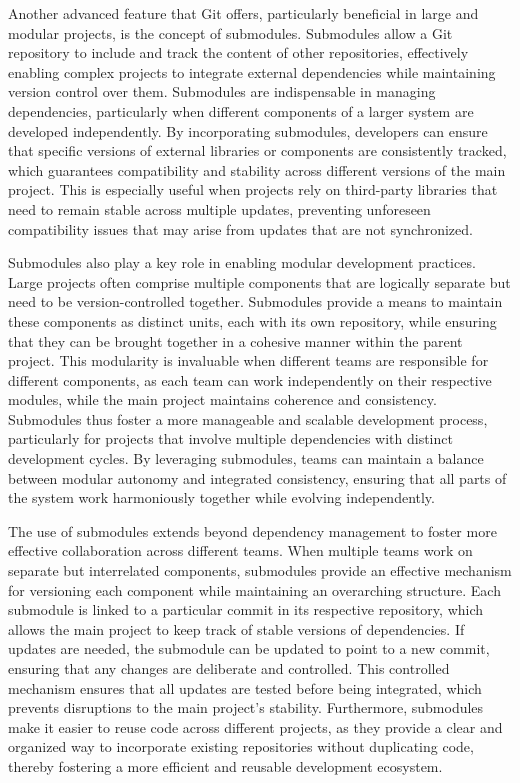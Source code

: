 Another advanced feature that Git offers, particularly beneficial in large and modular projects, is the concept of submodules. Submodules allow a Git repository to include and track the content of other repositories, effectively enabling complex projects to integrate external dependencies while maintaining version control over them. Submodules are indispensable in managing dependencies, particularly when different components of a larger system are developed independently. By incorporating submodules, developers can ensure that specific versions of external libraries or components are consistently tracked, which guarantees compatibility and stability across different versions of the main project. This is especially useful when projects rely on third-party libraries that need to remain stable across multiple updates, preventing unforeseen compatibility issues that may arise from updates that are not synchronized.

Submodules also play a key role in enabling modular development practices. Large projects often comprise multiple components that are logically separate but need to be version-controlled together. Submodules provide a means to maintain these components as distinct units, each with its own repository, while ensuring that they can be brought together in a cohesive manner within the parent project. This modularity is invaluable when different teams are responsible for different components, as each team can work independently on their respective modules, while the main project maintains coherence and consistency. Submodules thus foster a more manageable and scalable development process, particularly for projects that involve multiple dependencies with distinct development cycles. By leveraging submodules, teams can maintain a balance between modular autonomy and integrated consistency, ensuring that all parts of the system work harmoniously together while evolving independently.

The use of submodules extends beyond dependency management to foster more effective collaboration across different teams. When multiple teams work on separate but interrelated components, submodules provide an effective mechanism for versioning each component while maintaining an overarching structure. Each submodule is linked to a particular commit in its respective repository, which allows the main project to keep track of stable versions of dependencies. If updates are needed, the submodule can be updated to point to a new commit, ensuring that any changes are deliberate and controlled. This controlled mechanism ensures that all updates are tested before being integrated, which prevents disruptions to the main project's stability. Furthermore, submodules make it easier to reuse code across different projects, as they provide a clear and organized way to incorporate existing repositories without duplicating code, thereby fostering a more efficient and reusable development ecosystem.

